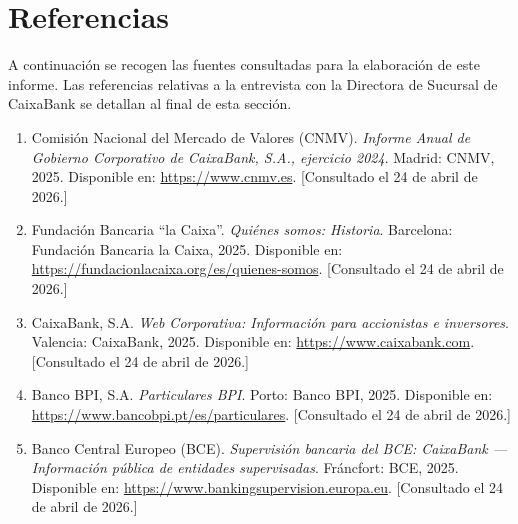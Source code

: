 
\chapter*{Referencias}
\label{ch:referencias}

A continuación se recogen las fuentes consultadas para la elaboración de este informe.
Las referencias relativas a la entrevista con la Directora de Sucursal de CaixaBank se
detallan al final de esta sección.


\begin{enumerate}



  \item \label{ref:cnmv}
    Comisión Nacional del Mercado de Valores (CNMV).
    \textit{Informe Anual de Gobierno Corporativo de CaixaBank, S.A., ejercicio 2024}.
    Madrid: CNMV, 2025.
    Disponible en: \url{https://www.cnmv.es}.
    [Consultado el 24 de abril de 2026.]

  \item \label{ref:fundacion}
    Fundación Bancaria ``la Caixa''.
    \textit{Quiénes somos: Historia}.
    Barcelona: Fundación Bancaria la Caixa, 2025.
    Disponible en: \url{https://fundacionlacaixa.org/es/quienes-somos}.
    [Consultado el 24 de abril de 2026.]

  \item \label{ref:web}
    CaixaBank, S.A.
    \textit{Web Corporativa: Información para accionistas e inversores}.
    Valencia: CaixaBank, 2025.
    Disponible en: \url{https://www.caixabank.com}.
    [Consultado el 24 de abril de 2026.]

  \item \label{ref:bpi}
    Banco BPI, S.A.
    \textit{Particulares BPI}.
    Porto: Banco BPI, 2025.
    Disponible en: \url{https://www.bancobpi.pt/es/particulares}.
    [Consultado el 24 de abril de 2026.]

  \item \label{ref:bce}
    Banco Central Europeo (BCE).
    \textit{Supervisión bancaria del BCE: CaixaBank — Información pública de entidades supervisadas}.
    Fráncfort: BCE, 2025.
    Disponible en: \url{https://www.bankingsupervision.europa.eu}.
    [Consultado el 24 de abril de 2026.]


\end{enumerate}
